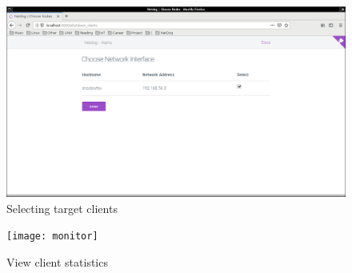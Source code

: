 \begin{figure}[H]
\includegraphics[scale=0.3]{target_clients}
\caption{Selecting target clients}
\end{figure}

\begin{figure}[H]
\texttt{[image: monitor]}
\caption{View client statistics}
\end{figure}
